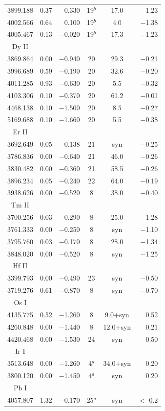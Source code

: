 \documentclass{aa}
\begin{document}
\begin{table}
\begin{tabular}{ccrccr}
3899.188 & 0.37 &    0.330 & 19$^{b}$ &  17.0 & $-$1.23\\
4002.566 & 0.64 &    0.100 & 19$^{b}$ &   4.0 & $-$1.38\\
4005.467 & 0.13 & $-$0.020 & 19$^{b}$ &  17.3 & $-$1.23\\
\hline
Dy II\\
\hline
3869.864 & 0.00 & $-$0.940 & 20 &  29.3 & $-$0.21\\
3996.689 & 0.59 & $-$0.190 & 20 &  32.6 & $-$0.20\\
4011.285 & 0.93 & $-$0.630 & 20 &   5.5 & $-$0.32\\
4103.306 & 0.10 & $-$0.370 & 20 &  61.2 & $-$0.01\\
4468.138 & 0.10 & $-$1.500 & 20 &   8.5 & $-$0.27\\
5169.688 & 0.10 & $-$1.660 & 20 &   5.5 & $-$0.38\\
\hline
Er II\\
\hline
3692.649 & 0.05 &    0.138 & 21 &  syn  & $-$0.25\\
3786.836 & 0.00 & $-$0.640 & 21 &  46.0 & $-$0.26\\
3830.482 & 0.00 & $-$0.360 & 21 &  58.5 & $-$0.26\\
3896.234 & 0.05 & $-$0.240 & 22 &  64.0 & $-$0.19\\
3938.626 & 0.00 & $-$0.520 &  8 &  38.0 & $-$0.40\\
\hline
Tm II\\
\hline
3700.256 & 0.03 & $-$0.290 & 8 &  25.0 & $-$1.28\\
3761.333 & 0.00 & $-$0.250 & 8 &  syn  & $-$1.10\\
3795.760 & 0.03 & $-$0.170 & 8 &  28.0 & $-$1.34\\
3848.020 & 0.00 & $-$0.520 & 8 &  syn  & $-$1.25\\
\hline
Hf II\\
\hline
3399.793 & 0.00 & $-$0.490 & 23 &  syn  & $-$0.50\\
3719.276 & 0.61 & $-$0.870 &  8 &  syn  & $-$0.70\\
\hline
Os I\\
\hline
4135.775 & 0.52 & $-$1.260 & 8 &   9.0+syn &    0.52\\
4260.848 & 0.00 & $-$1.440 & 8 &  12.0+syn &    0.21\\
4420.468 & 0.00 & $-$1.530 & 24 &  syn &    0.50\\
\hline
Ir I\\
\hline
3513.648 & 0.00 & $-$1.260 & 4$^{a}$ &  34.0+syn &    0.20\\
3800.120 & 0.00 & $-$1.450 & 4$^{a}$ &  syn  &    0.20\\
\hline
Pb I\\
\hline
4057.807 & 1.32 & $-$0.170 & 25$^{a}$ &  syn  &   $<$-0.2\\
\end{tabular}
\end{table}
\end{document}
